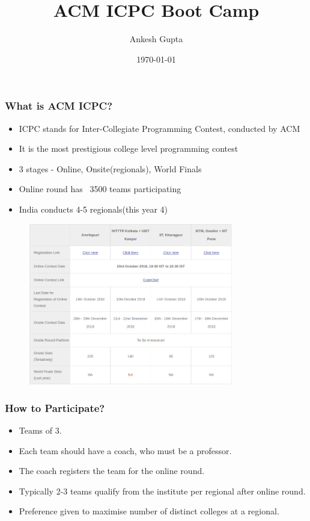 \documentclass{beamer}
\title[ACM ICPC Boot Camp]{ACM ICPC Boot Camp} %
\author{Ankesh Gupta}
\institute[IITD]
{
IIT Delhi \\ %
Credits: Adapted from IIT Bombay Slides
}
\date{\today} %
\begin{document}
\begin{frame}
\titlepage %
\end{frame}


\begin{frame}
\frametitle{What is ACM ICPC?}
\begin{itemize}
\item ICPC stands for Inter-Collegiate Programming Contest,
conducted by ACM
\item It is the most prestigious college level programming contest
\item 3 stages - Online, Onsite(regionals), World Finals
\item Online round has ~3500 teams participating
\item India conducts 4-5 regionals(this year 4)
\end{itemize}
\end{frame}


\begin{frame}
	\begin{figure}[!htb]
		\centering
		\includegraphics[width=0.8\textwidth]{this_year_stats.png}
	\end{figure}
\end{frame}

\begin{frame}
\frametitle{How to Participate?}
\begin{itemize}

\item Teams of 3.
\item Each team should have a coach, who must be a professor.
\item The coach registers the team for the online round.
\item Typically 2-3 teams qualify from the institute per regional after online round.
\item Preference given to maximise number of distinct colleges at a regional.
\end{itemize}
\end{frame}
\end{document}
